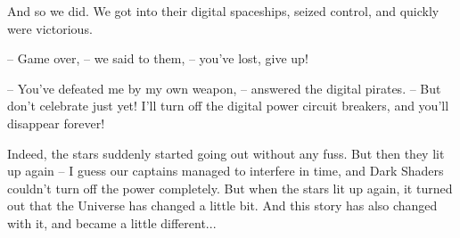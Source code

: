 \documentclass[ebook,oneside,final,openright]{memoir}
\begin{document}
And so we did. We got into their digital spaceships, seized control, and quickly were victorious.\par
– Game over, – we said to them, – you’ve lost, give up!\par
– You’ve defeated me by my own weapon, – answered the digital pirates. – But don’t celebrate just yet! I’ll turn off the digital power circuit breakers, and you’ll disappear forever!\par
\par
Indeed, the stars suddenly started going out without any fuss. But then they lit up again – I guess our captains managed to interfere in time, and Dark Shaders couldn’t turn off the power completely. But when the stars lit up again, it turned out that the Universe has changed a little bit. And this story has also changed with it, and became a little different...\par
\end{document}
